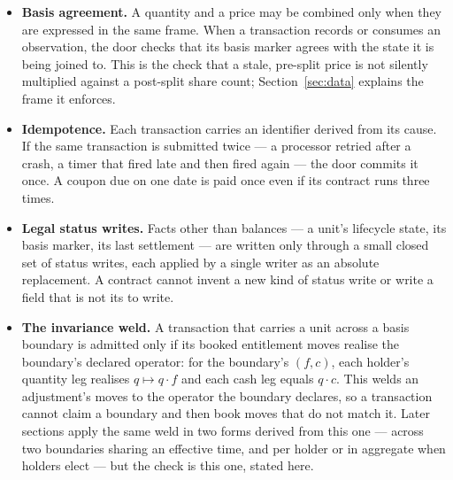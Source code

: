 \begin{itemize}[leftmargin=1.5em]
\item \textbf{Basis agreement.} A quantity and a price may be combined only when
they are expressed in the same frame. When a transaction records or consumes an
observation, the door checks that its basis marker agrees with the state it is
being joined to. This is the check that a stale, pre-split price is not silently
multiplied against a post-split share count; Section~\ref{sec:data} explains the
frame it enforces.
\item \textbf{Idempotence.} Each transaction carries an identifier derived from
its cause. If the same transaction is submitted twice --- a processor retried
after a crash, a timer that fired late and then fired again --- the door commits
it once. A coupon due on one date is paid once even if its contract runs three
times.
\item \textbf{Legal status writes.} Facts other than balances --- a unit's
lifecycle state, its basis marker, its last settlement --- are written only
through a small closed set of status writes, each applied by a single writer as an
absolute replacement. A contract cannot invent a new kind of status write or
write a field that is not its to write.
\item \textbf{The invariance weld.} A transaction that carries a unit across a
basis boundary is admitted only if its booked entitlement moves realise the
boundary's declared operator: for the boundary's $(f, c)$, each holder's quantity
leg realises $q \mapsto q \cdot f$ and each cash leg equals $q \cdot c$. This welds
an adjustment's moves to the operator the boundary declares, so a transaction
cannot claim a boundary and then book moves that do not match it. Later sections
apply the same weld in two forms derived from this one --- across two boundaries
sharing an effective time, and per holder or in aggregate when holders elect ---
but the check is this one, stated here.
\end{itemize}

